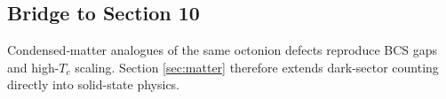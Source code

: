 \subsection{Bridge to Section 10}

Condensed‐matter analogues of the same octonion defects reproduce BCS
gaps and high-$T_c$ scaling.  Section \ref{sec:matter} therefore extends
dark-sector counting directly into solid-state physics.

\clearpage
